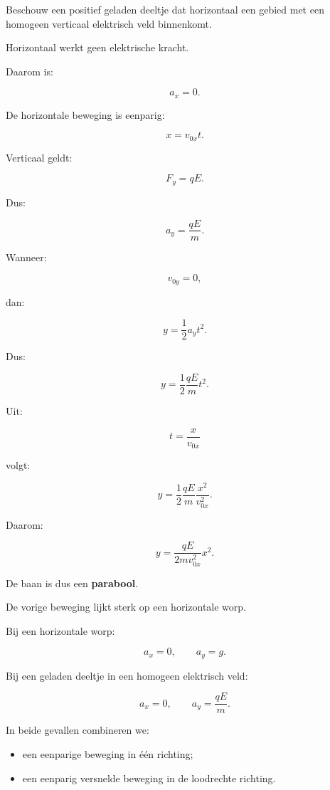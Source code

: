 \documentclass{ximera}
\begin{document}


Beschouw een positief geladen deeltje dat horizontaal een gebied met
een homogeen verticaal elektrisch veld binnenkomt.

Horizontaal werkt geen elektrische kracht.

Daarom is:

\[
a_x=0.
\]

De horizontale beweging is eenparig:

\[
x=v_{0x}t.
\]


Verticaal geldt:

\[
F_y=qE.
\]

Dus:

\[
a_y=\frac{qE}{m}.
\]

Wanneer:

\[
v_{0y}=0,
\]

dan:

\[
y
=
\frac12a_yt^2.
\]

Dus:

\[
y
=
\frac12
\frac{qE}{m}
t^2.
\]

Uit:

\[
t=\frac{x}{v_{0x}}
\]

volgt:

\[
y
=
\frac12
\frac{qE}{m}
\frac{x^2}{v_{0x}^2}.
\]

Daarom:

\[
\boxed{
y
=
\frac{qE}{2mv_{0x}^2}x^2.
}
\]


De baan is dus een \textbf{parabool}.




De vorige beweging lijkt sterk op een horizontale worp.

Bij een horizontale worp:

\[
a_x=0,
\qquad
a_y=g.
\]

Bij een geladen deeltje in een homogeen elektrisch veld:

\[
a_x=0,
\qquad
a_y=\frac{qE}{m}.
\]

In beide gevallen combineren we:

\begin{itemize}
  \item een eenparige beweging in één richting;
  \item een eenparig versnelde beweging in de loodrechte richting.
\end{itemize}
\end{document}
